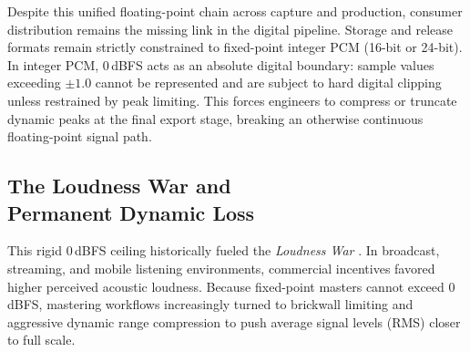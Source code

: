 \documentclass[10pt,twocolumn]{article}
\begin{document}
Despite this unified floating-point chain across capture and production, consumer distribution remains the missing link in the digital pipeline. Storage and release formats remain strictly constrained to fixed-point integer PCM (16-bit or 24-bit). In integer PCM, 0\,dBFS acts as an absolute digital boundary: sample values exceeding $\pm 1.0$ cannot be represented and are subject to hard digital clipping unless restrained by peak limiting. This forces engineers to compress or truncate dynamic peaks at the final export stage, breaking an otherwise continuous floating-point signal path.

\subsection[The Loudness War and Permanent Dynamic Loss]{The Loudness War and\\Permanent Dynamic Loss}
This rigid 0\,dBFS ceiling historically fueled the \textit{Loudness War} \cite{LoudnessWar}. In broadcast, streaming, and mobile listening environments, commercial incentives favored higher perceived acoustic loudness. Because fixed-point masters cannot exceed 0\,dBFS, mastering workflows increasingly turned to brickwall limiting and aggressive dynamic range compression to push average signal levels (RMS) closer to full scale.
\end{document}
